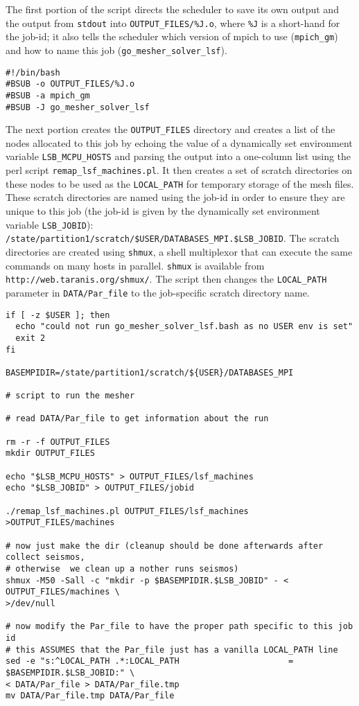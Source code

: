 \documentclass[onecolumn]{article}
\begin{document}
The first portion of the script directs the scheduler to save its own
output and the output from \texttt{stdout} into \texttt{OUTPUT\_FILES/\%J.o},
where \texttt{\%J} is a short-hand for the job-id; it also tells the scheduler
which version of mpich to use (\texttt{mpich\_gm}) and how to name this
job (\texttt{go\_mesher\_solver\_lsf}).

{\small
\begin{verbatim}
#!/bin/bash
#BSUB -o OUTPUT_FILES/%J.o
#BSUB -a mpich_gm
#BSUB -J go_mesher_solver_lsf
\end{verbatim}}

The next portion creates the \texttt{OUTPUT\_FILES} directory and creates
a list of the nodes allocated to this job by echoing the value of a
dynamically set environment variable \texttt{LSB\_MCPU\_HOSTS} and parsing the
output into a one-column list using the perl script \texttt{remap\_lsf\_machines.pl}.
It then creates a set of scratch directories on these nodes to be used as
the \texttt{LOCAL\_PATH} for temporary storage of the mesh files.
These scratch directories are named using the job-id in order to ensure
they are unique to this job (the job-id is given by the dynamically set
environment variable \texttt{LSB\_JOBID}): \\
\texttt{/state/partition1/scratch/\${USER}/DATABASES\_MPI.\$LSB\_JOBID}.
The scratch directories are created using \texttt{shmux}, a shell multiplexor
that can execute the same commands on many hosts in parallel.
\texttt{shmux} is available from \texttt{http://web.taranis.org/shmux/}.
The script then changes the \texttt{LOCAL\_PATH} parameter in
\texttt{DATA/Par\_file} to the job-specific scratch directory name.

{\small
\begin{verbatim}
if [ -z $USER ]; then
  echo "could not run go_mesher_solver_lsf.bash as no USER env is set"
  exit 2
fi

BASEMPIDIR=/state/partition1/scratch/${USER}/DATABASES_MPI

# script to run the mesher

# read DATA/Par_file to get information about the run

rm -r -f OUTPUT_FILES
mkdir OUTPUT_FILES

echo "$LSB_MCPU_HOSTS" > OUTPUT_FILES/lsf_machines
echo "$LSB_JOBID" > OUTPUT_FILES/jobid

./remap_lsf_machines.pl OUTPUT_FILES/lsf_machines >OUTPUT_FILES/machines

# now just make the dir (cleanup should be done afterwards after collect seismos,
# otherwise  we clean up a nother runs seismos)
shmux -M50 -Sall -c "mkdir -p $BASEMPIDIR.$LSB_JOBID" - < OUTPUT_FILES/machines \
>/dev/null

# now modify the Par_file to have the proper path specific to this job id
# this ASSUMES that the Par_file just has a vanilla LOCAL_PATH line
sed -e "s:^LOCAL_PATH .*:LOCAL_PATH                      =  $BASEMPIDIR.$LSB_JOBID:" \
< DATA/Par_file > DATA/Par_file.tmp
mv DATA/Par_file.tmp DATA/Par_file

\end{verbatim}}
\end{document}
